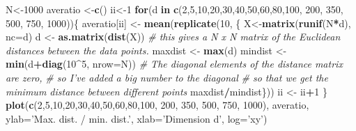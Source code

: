 \documentclass[]{book}
\newenvironment{Shaded}{\begin{snugshade}}{\end{snugshade}}
\newcommand{\CommentTok}[1]{\textcolor[rgb]{0.56,0.35,0.01}{\textit{#1}}}
\newcommand{\ControlFlowTok}[1]{\textcolor[rgb]{0.13,0.29,0.53}{\textbf{#1}}}
\newcommand{\DataTypeTok}[1]{\textcolor[rgb]{0.13,0.29,0.53}{#1}}
\newcommand{\DecValTok}[1]{\textcolor[rgb]{0.00,0.00,0.81}{#1}}
\newcommand{\KeywordTok}[1]{\textcolor[rgb]{0.13,0.29,0.53}{\textbf{#1}}}
\newcommand{\NormalTok}[1]{#1}
\newcommand{\OperatorTok}[1]{\textcolor[rgb]{0.81,0.36,0.00}{\textbf{#1}}}
\newcommand{\StringTok}[1]{\textcolor[rgb]{0.31,0.60,0.02}{#1}}
\theoremstyle{definition}
\theoremstyle{definition}
\theoremstyle{definition}
\theoremstyle{remark}
\begin{document}
\begin{Shaded}
\begin{Highlighting}[]
\NormalTok{N<-}\DecValTok{1000}
\NormalTok{averatio <-}\KeywordTok{c}\NormalTok{()}
\NormalTok{ii<-}\DecValTok{1}
\ControlFlowTok{for}\NormalTok{(d }\ControlFlowTok{in} \KeywordTok{c}\NormalTok{(}\DecValTok{2}\NormalTok{,}\DecValTok{5}\NormalTok{,}\DecValTok{10}\NormalTok{,}\DecValTok{20}\NormalTok{,}\DecValTok{30}\NormalTok{,}\DecValTok{40}\NormalTok{,}\DecValTok{50}\NormalTok{,}\DecValTok{60}\NormalTok{,}\DecValTok{80}\NormalTok{,}\DecValTok{100}\NormalTok{, }\DecValTok{200}\NormalTok{, }\DecValTok{350}\NormalTok{, }\DecValTok{500}\NormalTok{, }\DecValTok{750}\NormalTok{, }\DecValTok{1000}\NormalTok{))\{}
\NormalTok{  averatio[ii] <-}\StringTok{ }\KeywordTok{mean}\NormalTok{(}\KeywordTok{replicate}\NormalTok{(}\DecValTok{10}\NormalTok{, \{}
\NormalTok{  X<-}\KeywordTok{matrix}\NormalTok{(}\KeywordTok{runif}\NormalTok{(N}\OperatorTok{*}\NormalTok{d), }\DataTypeTok{nc=}\NormalTok{d)}
\NormalTok{  d <-}\StringTok{ }\KeywordTok{as.matrix}\NormalTok{(}\KeywordTok{dist}\NormalTok{(X)) }
  \CommentTok{# this gives a N x N matrix of the Euclidean distances between the data points.}
\NormalTok{  maxdist <-}\StringTok{ }\KeywordTok{max}\NormalTok{(d) }
\NormalTok{  mindist <-}\StringTok{ }\KeywordTok{min}\NormalTok{(d}\OperatorTok{+}\KeywordTok{diag}\NormalTok{(}\DecValTok{10}\OperatorTok{^}\DecValTok{5}\NormalTok{, }\DataTypeTok{nrow=}\NormalTok{N)) }
  \CommentTok{# The diagonal elements of the distance matrix are zero,}
  \CommentTok{# so I've added a big number to the diagonal }
  \CommentTok{# so that we get the minimum distance between different points}
\NormalTok{  maxdist}\OperatorTok{/}\NormalTok{mindist\}))}
\NormalTok{  ii <-}\StringTok{ }\NormalTok{ii}\OperatorTok{+}\DecValTok{1}
\NormalTok{\}}
\KeywordTok{plot}\NormalTok{(}\KeywordTok{c}\NormalTok{(}\DecValTok{2}\NormalTok{,}\DecValTok{5}\NormalTok{,}\DecValTok{10}\NormalTok{,}\DecValTok{20}\NormalTok{,}\DecValTok{30}\NormalTok{,}\DecValTok{40}\NormalTok{,}\DecValTok{50}\NormalTok{,}\DecValTok{60}\NormalTok{,}\DecValTok{80}\NormalTok{,}\DecValTok{100}\NormalTok{, }\DecValTok{200}\NormalTok{, }\DecValTok{350}\NormalTok{, }\DecValTok{500}\NormalTok{, }\DecValTok{750}\NormalTok{, }\DecValTok{1000}\NormalTok{), }
\NormalTok{     averatio, }\DataTypeTok{ylab=}\StringTok{'Max. dist. / min. dist.'}\NormalTok{, }\DataTypeTok{xlab=}\StringTok{'Dimension d'}\NormalTok{, }\DataTypeTok{log=}\StringTok{'xy'}\NormalTok{)}
\end{Highlighting}
\end{Shaded}
\end{document}
